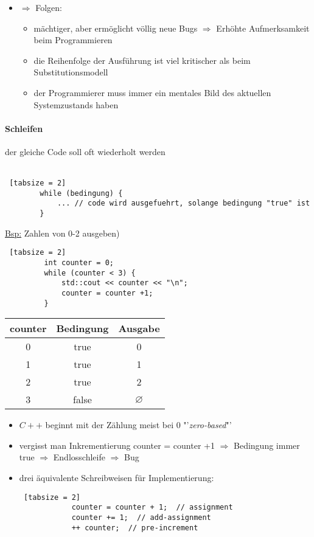\documentclass{article}
\begin{document}
\begin{itemize}
\begin{itemize}
\begin{lstlisting} [tabsize = 2]
 			\end{lstlisting}
 		\end{itemize}
 		\item $\Rightarrow$ Folgen:
 		\begin{itemize}
 			\item mächtiger, aber ermöglicht völlig neue Bugs $\Rightarrow$ Erhöhte Aufmerksamkeit beim Programmieren
 			\item die Reihenfolge der Ausführung ist viel kritischer als beim Substitutionsmodell
 			\item der Programmierer muss immer ein mentales Bild des aktuellen Systemzustands haben
 		\end{itemize}
 	\end{itemize}
	
	\paragraph{Schleifen}
	 der gleiche Code soll oft wiederholt werden \\ \\
	 
	 \begin{lstlisting} [tabsize = 2]
	 	while (bedingung) {
		 	... // code wird ausgefuehrt, solange bedingung "true" ist
	 	}
	 \end{lstlisting}
	 \underline{Bsp:} Zahlen von 0-2 ausgeben)
	 \begin{lstlisting} [tabsize = 2]
		 int counter = 0;
		 while (counter < 3) {
			 std::cout << counter << "\n";
			 counter = counter +1;
		 }
	 \end{lstlisting}
	 
	 \begin{tabular} {c|c|c}
	 	counter & Bedingung & Ausgabe \\
	 	\hline
	 	0 & true & 0 \\
	 	1 & true & 1 \\
	 	2 & true & 2 \\
	 	3 & false & $\varnothing$
	 \end{tabular}
	 
	\begin{itemize}
		\item $C++$ beginnt mit der Zählung meist bei $0$ "'\textit{zero-based}"'
		\item vergisst man Inkrementierung counter = counter +1 $\Rightarrow$ Bedingung immer true $\Rightarrow$ Endlosschleife $\Rightarrow$ Bug
		\item drei äquivalente Schreibweisen für Implementierung:
		\begin{lstlisting} [tabsize = 2]
			counter = counter + 1;  // assignment
			counter += 1;  // add-assignment
			++ counter;  // pre-increment
		\end{lstlisting}
	\end{itemize}
	
\end{document}
